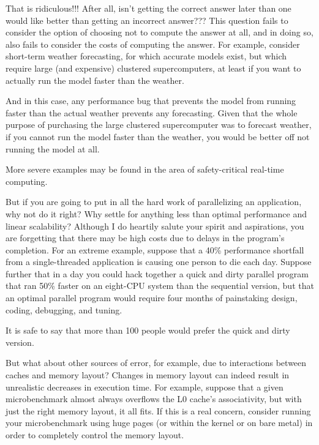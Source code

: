 \begin{enumerate}
\QuickQ{}
	That is ridiculous!!!
	After all, isn't getting the correct answer later than one would like
	better than getting an incorrect answer???
\QuickA{}
	This question fails to consider the option of choosing not to
	compute the answer at all, and in doing so, also fails to consider
	the costs of computing the answer.
	For example, consider short-term weather forecasting, for which
	accurate models exist, but which require large (and expensive)
	clustered supercomputers, at least if you want to actually run
	the model faster than the weather.

	And in this case, any performance bug that prevents the model from
	running faster than the actual weather prevents any forecasting.
	Given that the whole purpose of purchasing the large clustered
	supercomputer was to forecast weather, if you cannot run the
	model faster than the weather, you would be better off not running
	the model at all.

	More severe examples may be found in the area of safety-critical
	real-time computing.

\QuickQ{}
	But if you are going to put in all the hard work of parallelizing
	an application, why not do it right?
	Why settle for anything less than optimal performance and
	linear scalability?
\QuickA{}
	Although I do heartily salute your spirit and aspirations,
	you are forgetting that there may be high costs due to delays
	in the program's completion.
	For an extreme example, suppose that a 40\% performance shortfall
	from a single-threaded application is causing one person to die
	each day.
	Suppose further that in a day you could hack together a
	quick and dirty
	parallel program that ran 50\% faster on an eight-CPU system
	than the sequential version, but that an optimal parallel
	program would require four months of painstaking design, coding,
	debugging, and tuning.

	It is safe to say that more than 100 people would prefer the
	quick and dirty version.

\QuickQ{}
	But what about other sources of error, for example, due to
	interactions between caches and memory layout?
\QuickA{}
	Changes in memory layout can indeed result in unrealistic
	decreases in execution time.
	For example, suppose that a given microbenchmark almost
	always overflows the L0 cache's associativity, but with just the right
	memory layout, it all fits.
	If this is a real concern, consider running your microbenchmark
	using huge pages (or within the kernel or on bare metal) in
	order to completely control the memory layout.


\end{enumerate}
